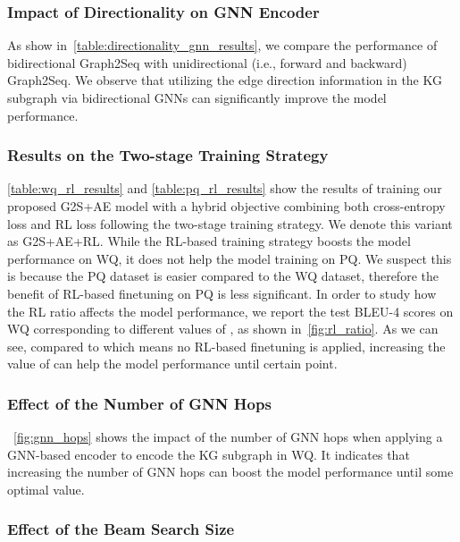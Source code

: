 \documentclass[journal]{IEEEtran}
\begin{document}
\subsubsection{Impact of Directionality on GNN Encoder}
As show in~\cref{table:directionality_gnn_results},
we compare the performance of bidirectional Graph2Seq with unidirectional 
(i.e., forward and backward) 
Graph2Seq.
We observe that utilizing the edge direction information in the KG subgraph via bidirectional GNNs can significantly improve the model performance.







\subsubsection{Results on the Two-stage Training Strategy}
\cref{table:wq_rl_results} and \cref{table:pq_rl_results} show the results of training our proposed G2S+AE model with a hybrid objective combining both cross-entropy loss and RL loss following the two-stage training strategy. We denote this variant as G2S+AE+RL.
While the RL-based training strategy boosts the model performance on WQ, it does not help the model training on PQ.
We suspect this is because the PQ dataset is easier compared to the WQ dataset, therefore the benefit of RL-based finetuning on PQ is less significant. 
In order to study how the RL ratio  affects the model performance, we report the test BLEU-4 scores on WQ corresponding to different values of , as shown in~\cref{fig:rl_ratio}. As we can see, compared to  which means no RL-based finetuning is applied, increasing the value of  can help the model performance until certain point.



 

\subsubsection{Effect of the Number of GNN Hops}
~\cref{fig:gnn_hops} shows the impact of the number of GNN hops when applying a GNN-based encoder to encode the KG subgraph in WQ.
It indicates that increasing the number of GNN hops can boost the model performance until some optimal value.


\subsubsection{Effect of the Beam Search Size}
\end{document}
